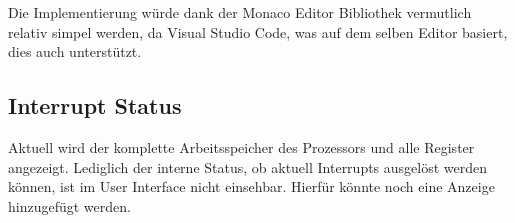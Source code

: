Die Implementierung würde dank der Monaco Editor Bibliothek vermutlich relativ simpel werden, da Visual Studio Code, was auf dem selben Editor basiert, dies auch unterstützt.

\subsection{Interrupt Status}

Aktuell wird der komplette Arbeitsspeicher des Prozessors und alle Register angezeigt. Lediglich der interne Status, ob aktuell Interrupts ausgelöst werden können, ist im User Interface nicht einsehbar. Hierfür könnte noch eine Anzeige hinzugefügt werden.